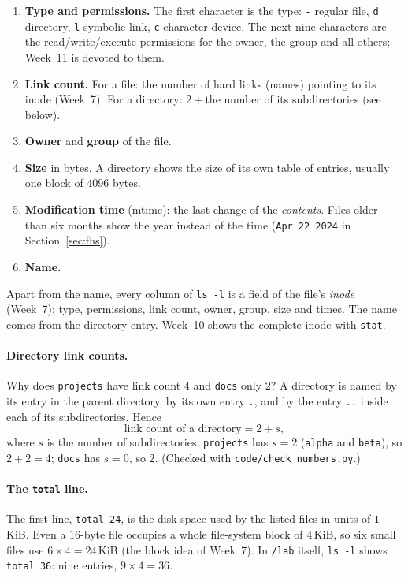 \documentclass[11pt,a4paper]{article}
\newcommand{\cmd}[1]{\texttt{#1}}
\begin{document}
\begin{enumerate}[leftmargin=1.4em]
  \item \textbf{Type and permissions.} The first character is the type: \texttt{-} regular file, \texttt{d} directory, \texttt{l} symbolic link, \texttt{c} character device. The next nine characters are the read/write/execute permissions for the owner, the group and all others; Week~11 is devoted to them.
  \item \textbf{Link count.} For a file: the number of hard links (names) pointing to its inode (Week~7). For a directory: $2 + {}$the number of its subdirectories (see below).
  \item \textbf{Owner} and \textbf{group} of the file.
  \item \textbf{Size} in bytes. A directory shows the size of its own table of entries, usually one block of $4096$ bytes.
  \item \textbf{Modification time} (mtime): the last change of the \emph{contents}. Files older than six months show the year instead of the time (\texttt{Apr 22 2024} in Section~\ref{sec:fhs}).
  \item \textbf{Name.}
\end{enumerate}

\begin{keyidea}
Apart from the name, every column of \cmd{ls -l} is a field of the file's \emph{inode} (Week~7): type, permissions, link count, owner, group, size and times. The name comes from the directory entry. Week~10 shows the complete inode with \cmd{stat}.
\end{keyidea}

\paragraph{Directory link counts.} Why does \texttt{projects} have link count $4$ and \texttt{docs} only $2$? A directory is named by its entry in the parent directory, by its own entry \texttt{.}, and by the entry \texttt{..} inside each of its subdirectories. Hence
\[
\text{link count of a directory} = 2 + s,
\]
where $s$ is the number of subdirectories: \texttt{projects} has $s = 2$ (\texttt{alpha} and \texttt{beta}), so $2 + 2 = 4$; \texttt{docs} has $s=0$, so $2$. (Checked with \texttt{code/check\_numbers.py}.)

\paragraph{The \texttt{total} line.} The first line, \texttt{total 24}, is the disk space used by the listed files in units of $1$\,KiB. Even a $16$-byte file occupies a whole file-system block of $4$\,KiB, so six small files use $6 \times 4 = 24$\,KiB (the block idea of Week~7). In \texttt{\tl/lab} itself, \cmd{ls -l} shows \texttt{total 36}: nine entries, $9 \times 4 = 36$.
\end{document}

